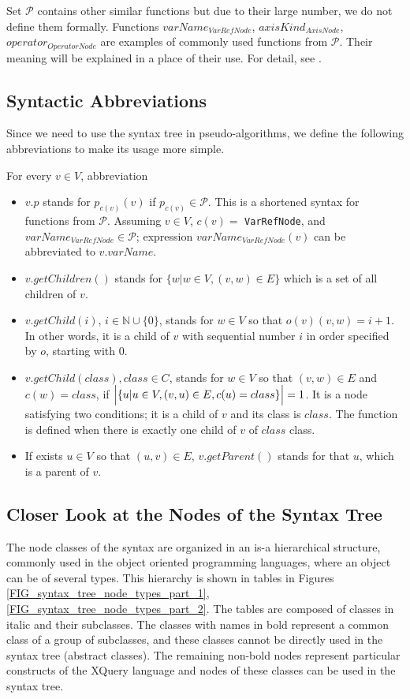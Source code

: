 Set $\mathcal{P}$ contains other similar functions but due to their large number, we do not define them formally. Functions $varName_{VarRefNode}$, $axisKind_{AxisNode}$, $operator_{OperatorNode}$ are examples of commonly used functions from $\mathcal{P}$. Their meaning will be explained in a place of their use. For detail, see \cite{thesis_schejbal}.


\subsection{Syntactic Abbreviations}
Since we need to use the syntax tree in pseudo-algorithms, we define the following abbreviations to make its usage more simple.

For every $v \in V$, abbreviation
\begin{itemize}
\item $v.p$ stands for $p_{c(v)}(v)$ if $p_{c(v)} \in \mathcal{P}$. This is a shortened syntax for functions from $\mathcal{P}$. Assuming $v \in V$, $c(v) =$ \texttt{VarRefNode}, and $varName_{VarRefNode} \in \mathcal{P}$; expression $varName_{VarRefNode}(v)$ can be abbreviated to $v.varName$. 
\item $v.getChildren()$ stands for $\{w | w \in V, (v,w) \in E\}$ which is a set of all children of $v$.
\item $v.getChild(i)$, $i \in \mathbb{N} \cup \{0\}$, stands for $w \in V$ so that $o(v)(v,w) = i + 1$. In other words, it is a child of $v$ with sequential number $i$ in order specified by $o$, starting with 0.
\item $v.getChild(class), class \in C$, stands for $w \in V$ so that $(v,w) \in E$ and $c(w) = class$, if $\Bigl | \{u | u \in V, (v,u) \in E, c(u) = class\}\Bigr | = 1$. It is a node satisfying two conditions; it is a child of $v$ and its class is $class$. The function is defined when there is exactly one child of $v$ of $class$ class.
\item If exists $u \in V$ so that $(u,v) \in E$, $v.getParent()$ stands for that $u$, which is a parent of $v$.
\end{itemize}

\subsection{Closer Look at the Nodes of the Syntax Tree}
The node classes of the syntax are organized in an is-a hierarchical structure, commonly used in the object oriented programming languages, where an object can be of several types. This hierarchy is shown in tables in Figures \ref{FIG_syntax_tree_node_types_part_1}, \ref{FIG_syntax_tree_node_types_part_2}. The tables are composed of classes in italic and their subclasses. The classes with names in bold represent a common class of a group of subclasses, and these classes cannot be directly used in the syntax tree (abstract classes). The remaining non-bold nodes represent particular constructs of the XQuery language and nodes of these classes can be used in the syntax tree. 

